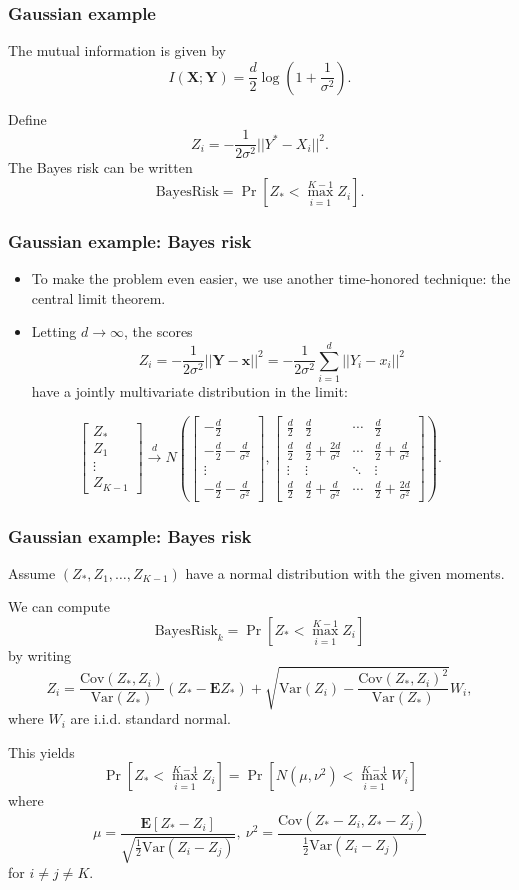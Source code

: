 \documentclass{beamer}
\newcommand{\E}{\textbf{E}}
\newcommand{\Cov}{\text{Cov}}
\newcommand{\Var}{\text{Var}}
\newcommand{\bx}{\boldsymbol{x}}
\newcommand{\bX}{\boldsymbol{X}}
\newcommand{\bY}{\boldsymbol{Y}}
\begin{document}
\begin{frame}
\frametitle{Gaussian example}
The mutual information is given by
\[
I(\bX;\bY) = \frac{d}{2}\log(1 + \frac{1}{\sigma^2}).
\]

Define
\[
Z_i = -\frac{1}{2\sigma^2}||Y^* - X_i||^2.
\]
The Bayes risk can be written
\[
\text{BayesRisk} = \Pr[Z_* < \max_{i=1}^{K-1} Z_i].
\]
\end{frame}

\begin{frame}
\frametitle{Gaussian example: Bayes risk}
\begin{itemize}
\item To make the problem even easier, we use another time-honored technique: the central limit theorem.
\item Letting $d \to \infty$, the scores
\[
Z_i = -\frac{1}{2\sigma^2} ||\bY - \bx||^2 = -\frac{1}{2\sigma^2} \sum_{i=1}^d ||Y_i - x_i||^2
\]
have a jointly multivariate distribution in the limit:
\end{itemize}
\[
\begin{bmatrix}
Z_*\\
Z_1\\
\vdots\\
Z_{K-1}
\end{bmatrix} \stackrel{d}{\to} N\left(
\begin{bmatrix}
-\frac{d}{2}\\
-\frac{d}{2} - \frac{d}{\sigma^2}\\
\vdots\\
-\frac{d}{2} - \frac{d}{\sigma^2}
\end{bmatrix},
\begin{bmatrix}
\frac{d}{2} & \frac{d}{2} & \cdots & \frac{d}{2}\\
\frac{d}{2} & \frac{d}{2} + \frac{2d}{\sigma^2} & \cdots & \frac{d}{2} + \frac{d}{\sigma^2}\\
\vdots & \vdots & \ddots & \vdots\\
\frac{d}{2} & \frac{d}{2} + \frac{d}{\sigma^2} & \cdots & \frac{d}{2} + \frac{2d}{\sigma^2}
\end{bmatrix}
\right).
\]
\end{frame}

\begin{frame}
\frametitle{Gaussian example: Bayes risk}

Assume $(Z_*, Z_1,\hdots, Z_{K-1})$ have a normal distribution with the given moments.

We can compute
\[
\text{BayesRisk}_k = \Pr[Z_* < \max_{i=1}^{K-1} Z_i]
\]
by writing
\[
Z_i = \frac{\Cov(Z_*, Z_i)}{\Var(Z_*)} (Z_* - \E Z_*) + \sqrt{\Var(Z_i) - \frac{\Cov(Z_*, Z_i)^2}{\Var(Z_*)}} W_i,
\]
where $W_i$ are i.i.d. standard normal.

This yields
\[
\Pr[Z_* < \max_{i=1}^{K-1} Z_i] = \Pr[N(\mu, \nu^2) < \max_{i=1}^{K-1} W_i]
\]
where
\[
\mu = \frac{\E[Z_* - Z_i]}{\sqrt{\frac{1}{2}\Var(Z_i - Z_j)}},\ \nu^2 = \frac{\Cov(Z_* - Z_i, Z_* - Z_j)}{\frac{1}{2}\Var(Z_i - Z_j)}
\]
for $i \neq j \neq K$.

\end{frame}
\end{document}
